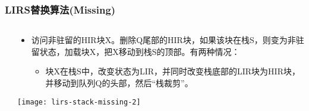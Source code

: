 \begin{frame}[plain]
	\frametitle{LIRS替换算法(Missing)}
	\begin{columns}
		\begin{column}{.1\textwidth}
			\centering
			
			
		\end{column}
		
		\begin{column}{.9\textwidth}
			
			\begin{itemize}
				
				\item 访问非驻留的HIR块X。删除Q尾部的HIR块，如果该块在栈S，则变为非驻留状态，加载块X，把X移动到栈S的顶部。有两种情况：
				\begin{itemize}
				 \item 块X在栈S中，改变状态为LIR，并同时改变栈底部的LIR块为HIR块，并移动到队列Q的头部，然后“栈裁剪”。
					
					
				\end{itemize}
			\end{itemize}
			\centering
			\texttt{[image: lirs-stack-missing-2]}
			
		\end{column}
		
		
	\end{columns}
\end{frame}


